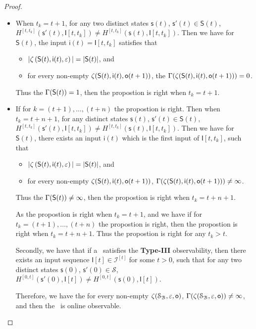 \begin{appendices}
\begin{proof}
\begin{itemize}
\item When $t_k=t+1$, for any two distinct states $\mathsf{s}(t)$, $\mathsf{s}'(t) \in \mathsf{S}(t)$, $H^{[t,t_k]}(\mathsf{s}'(t),\mathsf{I}[t,t_k])\neq H^{[t,t_k]}(\mathsf{s}(t), \mathsf{I}[t,t_k])$. Then we have for $\mathsf{S}(t)$,
 the input $\mathsf{i}(t)=\mathsf{I}[t,t_k]$ satisfies that
 \begin{itemize}
 \item  $|\zeta\left(\mathsf{S}(t),\mathsf{i}(t),\varepsilon\right)|=|\mathsf{S}(t)|$, and 
 \item  for every non-empty $\zeta(\mathsf{S}(t),\mathsf{i}(t),\mathsf{o}(t+1))$, the $\Gamma(\zeta(\mathsf{S}(t),\mathsf{i}(t),\mathsf{o}(t+1)))=0$.
 \end{itemize}
Thus the $\Gamma(\mathsf{S}(t))=1$, then the propostion is right when $t_k =t+1$.

\item If for $k=(t+1),\ldots, (t+n)$ the propostion is right. Then when $t_k=t+n+1$, for any distinct states $\mathsf{s}(t)$, $\mathsf{s}'(t) \in \mathsf{S}(t)$, $H^{[t,t_k]}(\mathsf{s}'(t),\mathsf{I}[t,t_k])\neq H^{[t,t_k]}(\mathsf{s}(t), \mathsf{I}[t,t_k])$. Then we have for $\mathsf{S}(t)$,
 there exists an input $\mathsf{i}(t)$ which is the first input of $\mathsf{I}[t,t_k]$, such that
 \begin{itemize}
\item  $|\zeta\left(\mathsf{S}(t),\mathsf{i}(t),\varepsilon\right)|=|\mathsf{S}(t)|$, and 
 \item  for every non-empty $\zeta(\mathsf{S}(t),\mathsf{i}(t),\mathsf{o}(t+1))$, $\Gamma(\zeta(\mathsf{S}(t),\mathsf{i}(t),\mathsf{o}(t+1)))\ne \infty$.
 \end{itemize}
Thus the $\Gamma(\mathsf{S}(t))\ne \infty$, then the propostion is right when $t_k =t+n+1$.

As the propostion is right when $t_k =t+1$, and we have if for $t_k=(t+1),\ldots, (t+n)$ the propostion is right, then the propostion is right when $t_k=t+n+1$. Thus the propostion is right for any $t_k>t$.

Secondly, we have that if a \BCN\ satisfies the {\bf Type-III} observability, then there exists an input sequence $\mathsf{I}[t]\in\mathcal{I}^{[t]}$ for some $t>0$, such that for any two distinct states $\mathsf{s}(0)$, $\mathsf{s}'(0) \in \mathcal{S}$, $H^{[0,t]}(\mathsf{s}'(0),\mathsf{I}[t])\neq H^{[0,t]}(\mathsf{s}(0), \mathsf{I}[t])$.

Therefore, we have the for every non-empty $\zeta(\mathcal{S}_{\mathcal{B}},\varepsilon, \mathsf{o})$, $\Gamma(\zeta(\mathcal{S}_{\mathcal{B}},\varepsilon,\mathsf{o}))\ne \infty$, and then the \BCN\ is online observable.
 \end{itemize}
\end{proof}


\end{appendices}
